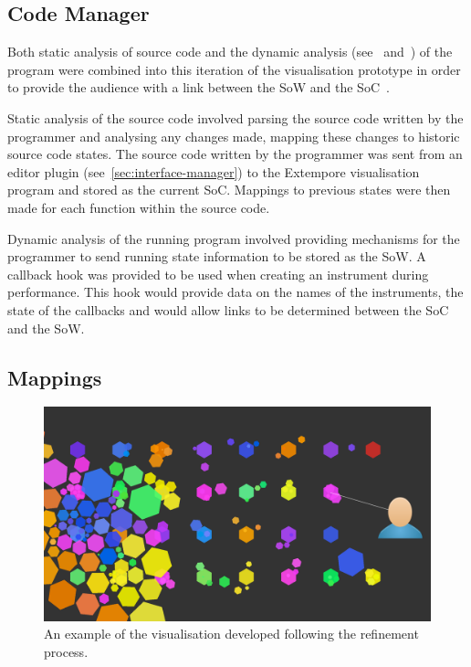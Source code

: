\subsection{Code Manager}

Both static analysis of source code and the dynamic analysis (see~\cite{Eisenbarth2003} and~\cite{Jerding1997}) of the program were combined into this iteration of the visualisation prototype in order to provide the audience with a link between the \acf{SoW} and the \acf{SoC}~\cite{Swift2013}. \more

Static analysis of the source code involved parsing the source code written by the programmer and analysing any changes made, mapping these changes to historic source code states. The source code written by the programmer was sent from an editor plugin (see~\ref{sec:interface-manager}) to the Extempore visualisation program and stored as the current \ac{SoC}. Mappings to previous states were then made for each function within the source code.

Dynamic analysis of the running program involved providing mechanisms for the programmer to send running state information to be stored as the \ac{SoW}. A callback hook was provided to be used when creating an instrument during performance. This hook would provide data on the names of the instruments, the state of the callbacks and would allow links to be determined between the \ac{SoC} and the \ac{SoW}.

\subsection{Mappings}

\begin{figure}
\centering
\includegraphics[width=\textwidth]{../images/final-visualisations/final-code-visualisation.png}
\caption{An example of the visualisation developed following the refinement process.}
\label{fig:final-visualisation}
\end{figure}


